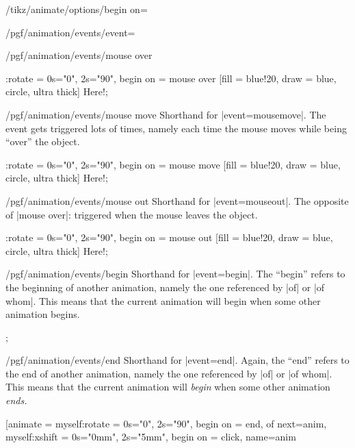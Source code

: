 \begin{key}{/tikz/animate/options/begin on=}
\begin{key}{/pgf/animation/events/event=}
\begin{key}{/pgf/animation/events/mouse over}
\begin{codeexample}[width=2cm]
\tikz \node :rotate = { 0s="0", 2s="90", begin on = {mouse over} }
  [fill = blue!20, draw = blue, circle, ultra thick] {Here!}; 
\end{codeexample}
    \end{key}
    \begin{key}{/pgf/animation/events/mouse move}
      Shorthand for |event=mousemove|. The event gets triggered lots
      of times, namely each time the mouse moves while being ``over''
      the object.
\begin{codeexample}[width=2cm]
\tikz \node :rotate = { 0s="0", 2s="90", begin on = {mouse move} }
  [fill = blue!20, draw = blue, circle, ultra thick] {Here!}; 
\end{codeexample}
    \end{key}
    \begin{key}{/pgf/animation/events/mouse out}
      Shorthand for |event=mouseout|. The opposite of |mouse over|:
      triggered when the mouse leaves the object.
\begin{codeexample}[width=2cm]
\tikz \node :rotate = { 0s="0", 2s="90", begin on = {mouse out} }
  [fill = blue!20, draw = blue, circle, ultra thick] {Here!}; 
\end{codeexample}
    \end{key}
    \begin{key}{/pgf/animation/events/begin}
      Shorthand for |event=begin|. The ``begin'' refers to the
      beginning of another animation, namely the one referenced by
      |of| or |of whom|. This means that the current animation will
      begin when some other animation begins.
\begin{codeexample}[width=2cm]
\tikz {}; 
\end{codeexample}
    \end{key}
    \begin{key}{/pgf/animation/events/end}
      Shorthand for |event=end|. Again, the ``end'' refers to the
      end of another animation, namely the one referenced by
      |of| or |of whom|. This means that the current animation will
      \emph{begin} when some other animation \emph{ends.}
\begin{codeexample}[width=2cm]
\tikz \node [animate = {
    myself:rotate = { 0s="0", 2s="90", begin on = {end, of next=anim}},
    myself:xshift = { 0s="0mm", 2s="5mm", begin on = {click}, name=anim } 
}
\end{codeexample}
\end{key}
\end{key}
\end{key}
